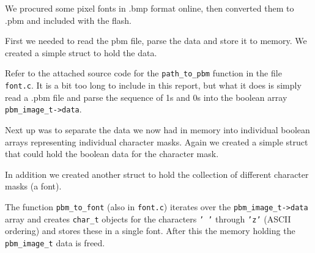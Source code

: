 We procured some pixel fonts in .bmp format online, then converted them to .pbm and included with the flash.

First we needed to read the pbm file, parse the data and store it to memory.
We created a simple struct to hold the data.



Refer to the attached source code for the \texttt{path\_to\_pbm} function in the file \texttt{font.c}.
It is a bit too long to include in this report, but what it does is simply read a .pbm file and parse the sequence of 1s and 0s into the boolean array \texttt{pbm\_image\_t->data}.

Next up was to separate the data we now had in memory into individual boolean arrays representing individual character masks.
Again we created a simple struct that could hold the boolean data for the character mask.



In addition we created another struct to hold the collection of different character masks (a font).



The function \texttt{pbm\_to\_font} (also in \texttt{font.c}) iterates over the \texttt{pbm\_image\_t->data} array and creates \texttt{char\_t} objects for the characters \texttt{' '} through \texttt{'z'} (ASCII ordering) and stores these in a single font.
After this the memory holding the \texttt{pbm\_image\_t} data is freed.

